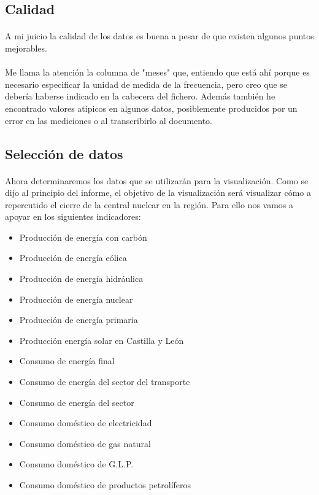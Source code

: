 \documentclass[11pt,spanish]{article}
\begin{document}
		\subsection{Calidad}

			\paragraph{}
			A mi juicio la calidad de los datos es buena a pesar de que existen algunos puntos mejorables.

			\paragraph{}
			Me llama la atención la columna de "meses" que, entiendo que está ahí porque es necesario especificar la unidad de medida de la frecuencia, pero creo que se debería haberse indicado en la cabecera del fichero. Además también he encontrado valores atípicos en algunos datos, posiblemente producidos por un error en las mediciones o al transcribirlo al documento.

		\subsection{Selección de datos}

			\paragraph{}
			Ahora determinaremos los datos que se utilizarán para la visualización. Como se dijo al principio del informe, el objetivo de la visualización será visualizar cómo a repercutido el cierre de la central nuclear en la región. Para ello nos vamos a apoyar en los siguientes indicadores:

			\begin{itemize}
				\item Producción de energía con carbón
				\item Producción de energía eólica
				\item Producción de energía hidráulica
				\item Producción de energía nuclear
				\item Producción de energía primaria
				\item Producción energía solar en Castilla y León
				\item Consumo de energía final
				\item Consumo de energía del sector del transporte
				\item Consumo de energía del sector
				\item Consumo doméstico de electricidad
				\item Consumo doméstico de gas natural
				\item Consumo doméstico de G.L.P.
				\item Consumo doméstico de productos petrolíferos
			\end{itemize}
\end{document}
